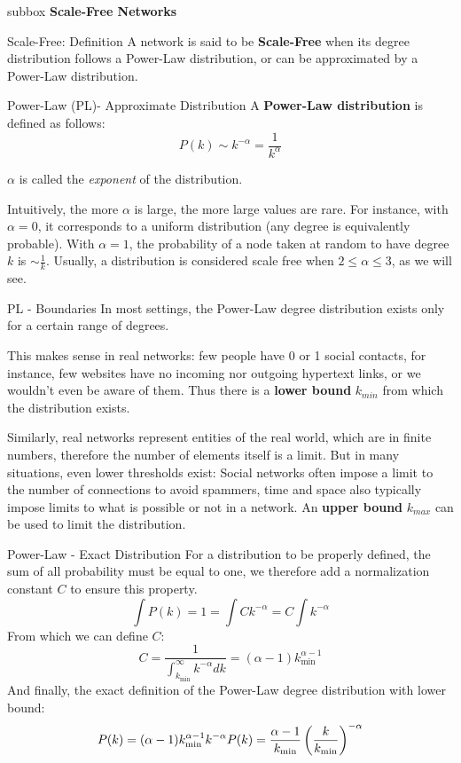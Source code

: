 \begin{subbox}{subbox}{}
    \centering
    \Large{\textbf{Scale-Free Networks}}
\end{subbox}


\begin{textbox}{Scale-Free: Definition}
    A network is said to be \textbf{Scale-Free} when its degree distribution follows a Power-Law distribution, or can be approximated by a Power-Law distribution.
\end{textbox}


\begin{textbox}{Power-Law (PL)- Approximate Distribution}
    A \textbf{Power-Law distribution} is defined as follows:
    \[
        P(k) \sim k^{-\alpha} = \frac{1}{k^\alpha}
    \]

    $\alpha$ is called the \textit{exponent} of the distribution.

    Intuitively, the more $\alpha$ is large, the more large values are rare. For instance, with $\alpha=0$, it corresponds to a uniform distribution (any degree is equivalently probable). With $\alpha=1$, the probability of a node taken at random to have degree $k$ is $\sim \frac{1}{k}$. Usually, a distribution is considered scale free when $2\leq \alpha\leq 3$, as we will see.
\end{textbox}


\begin{textbox}{PL - Boundaries}
    In most settings, the Power-Law degree distribution exists only for a certain range of degrees.

    This makes sense in real networks: few people have 0 or 1 social contacts, for instance, few websites have no incoming nor outgoing hypertext links, or we wouldn't even be aware of them. Thus there is a \textbf{lower bound} $k_{min}$ from which the distribution exists.

    Similarly, real networks represent entities of the real world, which are in finite numbers, therefore the number of elements itself is a limit. But in many situations, even lower thresholds exist: Social networks often impose a limit to the number of connections to avoid spammers, time and space also typically impose limits to what is possible or not in a network. An \textbf{upper bound} $k_{max}$ can be used to limit the distribution.
\end{textbox}


\begin{textbox}{Power-Law - Exact Distribution}
    For a distribution to be properly defined, the sum of all probability must be equal to one, we therefore add a normalization constant $C$ to ensure this property.
    \[
        \int P(k)=1= \int Ck^{-\alpha}=C\int k^{-\alpha}
    \]
    From which we can define $C$:
    \[
        C = \frac{1}{\int_{k_{\min}}^{\infty}k^{-\alpha} dk}=(\alpha-1)k_{\min}^{\alpha-1}
    \]
    And finally, the exact definition of the Power-Law degree distribution with lower bound:
    \[
        P(k) = (\alpha-1)k_{\min}^{\alpha-1}k^{-\alpha} \\
        P(k) = \frac{\alpha-1}{k_{\min}}\left(\frac{k}{k_{\min}}\right)^{-\alpha}
    \]
\end{textbox}


